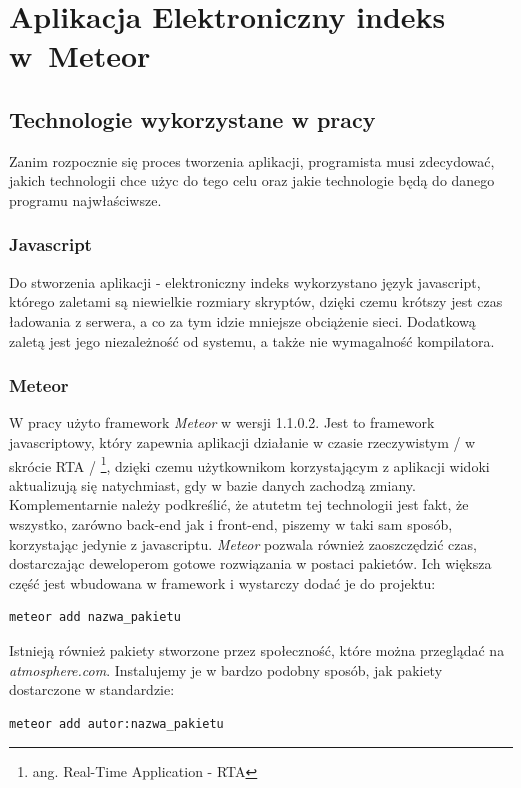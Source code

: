 \documentclass{xmgr}
\begin{document}
\chapter{Aplikacja Elektroniczny indeks w~Meteor}
\section{Technologie wykorzystane w pracy}
\indent \indent \indent Zanim rozpocznie się proces tworzenia aplikacji, programista musi zdecydować, jakich technologii chce użyc do tego celu oraz jakie technologie będą do danego programu najwłaściwsze.
\subsection{Javascript}
\indent \indent \indent Do stworzenia aplikacji - elektroniczny indeks wykorzystano język javascript, którego zaletami są niewielkie rozmiary skryptów, dzięki czemu krótszy jest czas ładowania z serwera, a co za tym idzie mniejsze obciążenie sieci. Dodatkową zaletą jest jego niezależność od systemu, a także nie wymagalność kompilatora.
\subsection{Meteor}
\indent \indent \indent W pracy użyto framework \textit{Meteor} w wersji 1.1.0.2. Jest to framework javascriptowy, który zapewnia aplikacji działanie w czasie rzeczywistym / w skrócie RTA / \footnote{ang. Real-Time Application - RTA}, dzięki czemu użytkownikom korzystającym z aplikacji widoki aktualizują się natychmiast, gdy w bazie danych zachodzą zmiany. Komplementarnie należy podkreślić, że atutetm tej technologii jest fakt, że wszystko, zarówno back-end jak i front-end, piszemy w taki sam sposób, korzystając jedynie z javascriptu. \textit{Meteor} pozwala również zaoszczędzić czas, dostarczając deweloperom gotowe rozwiązania w postaci pakietów. Ich większa część jest wbudowana w framework i wystarczy dodać je do projektu:
\begin{lstlisting}[language=bash,caption={Dodanie standardowego pakietu do projektu}]
	meteor add nazwa_pakietu
\end{lstlisting}
Istnieją również pakiety stworzone przez społeczność, które można przeglądać na \textit{atmosphere.com}. Instalujemy je w bardzo podobny sposób, jak pakiety dostarczone w standardzie:
\begin{lstlisting}[language=bash,caption={Dodanie zewnętrznego pakietu do projektu}]
	meteor add autor:nazwa_pakietu
\end{lstlisting}
\end{document}
